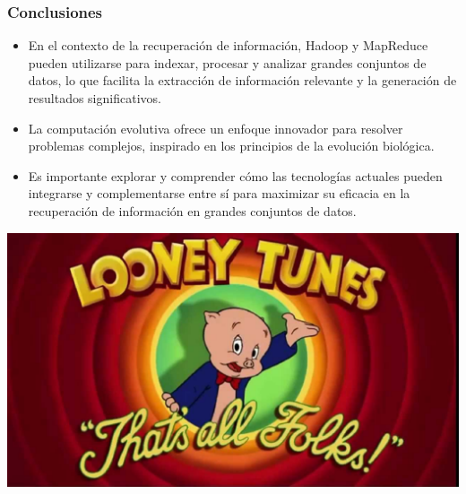 \documentclass[
10pt, %
aspectratio=169, %
]{beamer}
\begin{document}
	\begin{frame}
		
		\frametitle{Conclusiones}
		
		\begin{itemize}
			
			\item En el contexto de la recuperación de información, Hadoop y MapReduce pueden utilizarse para indexar, procesar y analizar grandes conjuntos de datos, lo que facilita la extracción de información relevante y la generación de resultados significativos. \\[4mm]
			
			\item La computación evolutiva ofrece un enfoque innovador para resolver problemas complejos, inspirado en los principios de la evolución biológica. \\[4mm]
			
			\item Es importante explorar y comprender cómo las tecnologías actuales pueden integrarse y complementarse entre sí para maximizar su eficacia en la recuperación de información en grandes conjuntos de datos.
			
		\end{itemize}
		
	\end{frame}
	
	{
		{%
			\includegraphics[width=\paperwidth,height=\paperheight]{es-todo.jpg}
		}
		
		\begin{frame}
		\end{frame}
	}
	
\end{document}
